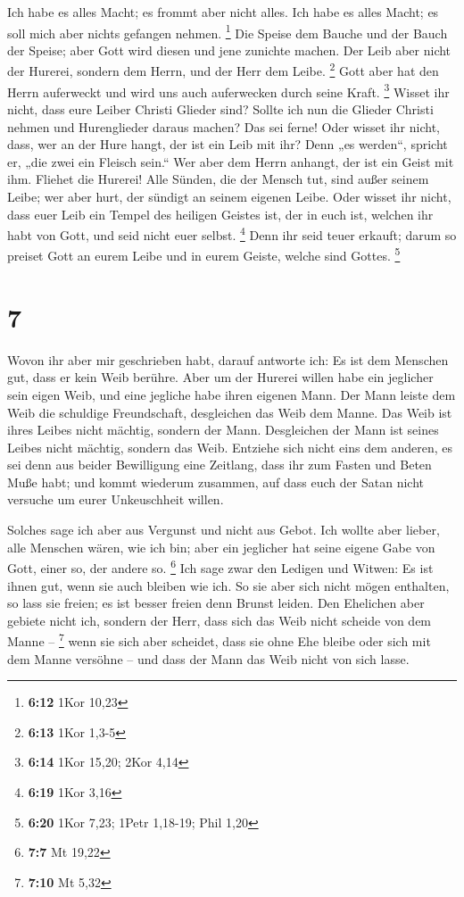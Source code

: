  Ich habe es alles Macht; es frommt aber nicht alles. Ich
habe es alles Macht; es soll mich aber nichts gefangen nehmen.
\footnote{\textbf{6:12} 1Kor 10,23}  Die Speise dem Bauche
und der Bauch der Speise; aber Gott wird diesen und jene zunichte
machen. Der Leib aber nicht der Hurerei, sondern dem Herrn, und der Herr
dem Leibe. \footnote{\textbf{6:13} 1Kor 1,3-5}  Gott aber
hat den Herrn auferweckt und wird uns auch auferwecken durch seine
Kraft. \footnote{\textbf{6:14} 1Kor 15,20; 2Kor 4,14} 
Wisset ihr nicht, dass eure Leiber Christi Glieder sind? Sollte ich nun
die Glieder Christi nehmen und Hurenglieder daraus machen? Das sei
ferne!  Oder wisset ihr nicht, dass, wer an der Hure hangt,
der ist ein Leib mit ihr? Denn „es werden``, spricht er, „die zwei ein
Fleisch sein.``  Wer aber dem Herrn anhangt, der ist ein
Geist mit ihm.  Fliehet die Hurerei! Alle Sünden, die der
Mensch tut, sind außer seinem Leibe; wer aber hurt, der sündigt an
seinem eigenen Leibe.  Oder wisset ihr nicht, dass euer
Leib ein Tempel des heiligen Geistes ist, der in euch ist, welchen ihr
habt von Gott, und seid nicht euer selbst. \footnote{\textbf{6:19} 1Kor
  3,16}  Denn ihr seid teuer erkauft; darum so preiset Gott
an eurem Leibe und in eurem Geiste, welche sind Gottes. \footnote{\textbf{6:20}
  1Kor 7,23; 1Petr 1,18-19; Phil 1,20}

\hypertarget{section-3}{%
\section{7}\label{section-3}}

 Wovon ihr aber mir geschrieben habt, darauf antworte ich:
Es ist dem Menschen gut, dass er kein Weib berühre.  Aber um
der Hurerei willen habe ein jeglicher sein eigen Weib, und eine jegliche
habe ihren eigenen Mann.  Der Mann leiste dem Weib die
schuldige Freundschaft, desgleichen das Weib dem Manne.  Das
Weib ist ihres Leibes nicht mächtig, sondern der Mann. Desgleichen der
Mann ist seines Leibes nicht mächtig, sondern das Weib. 
Entziehe sich nicht eins dem anderen, es sei denn aus beider Bewilligung
eine Zeitlang, dass ihr zum Fasten und Beten Muße habt; und kommt
wiederum zusammen, auf dass euch der Satan nicht versuche um eurer
Unkeuschheit willen.

 Solches sage ich aber aus Vergunst und nicht aus Gebot.
 Ich wollte aber lieber, alle Menschen wären, wie ich bin;
aber ein jeglicher hat seine eigene Gabe von Gott, einer so, der andere
so. \footnote{\textbf{7:7} Mt 19,22}  Ich sage zwar den
Ledigen und Witwen: Es ist ihnen gut, wenn sie auch bleiben wie ich.
 So sie aber sich nicht mögen enthalten, so lass sie freien;
es ist besser freien denn Brunst leiden.  Den Ehelichen
aber gebiete nicht ich, sondern der Herr, dass sich das Weib nicht
scheide von dem Manne -- \footnote{\textbf{7:10} Mt 5,32} 
wenn sie sich aber scheidet, dass sie ohne Ehe bleibe oder sich mit dem
Manne versöhne -- und dass der Mann das Weib nicht von sich lasse.

